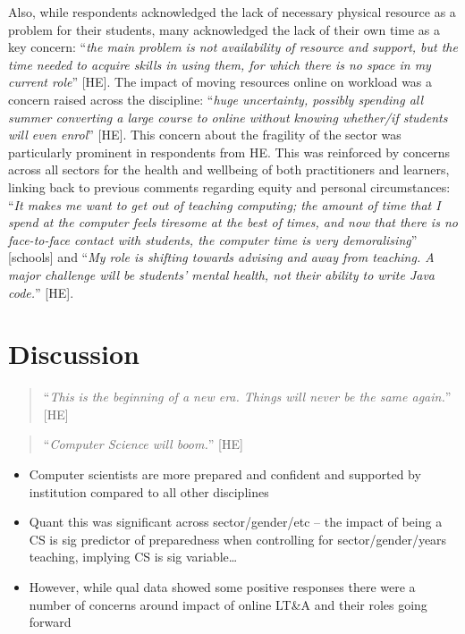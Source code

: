 \documentclass[sigconf]{acmart}
\begin{document}
Also, while respondents acknowledged the lack of necessary physical
resource as a problem for their students, many acknowledged the lack
of their own time as a key concern: ``{\emph{the main problem is not
availability of resource and support, but the time needed to acquire
skills in using them, for which there is no space in my current
role}}'' [HE]. The impact of moving resources online on workload was a
concern raised across the discipline: ``{\emph{huge uncertainty,
possibly spending all summer converting a large course to online
without knowing whether/if students will even enrol}}'' [HE]. This
concern about the fragility of the sector was particularly prominent
in respondents from HE. This was reinforced by concerns across all
sectors for the health and wellbeing of both practitioners and
learners, linking back to previous comments regarding equity and
personal circumstances: ``{\emph{It makes me want to get out of
teaching computing; the amount of time that I spend at the computer
feels tiresome at the best of times, and now that there is no
face-to-face contact with students, the computer time is very
demoralising}}'' [schools] and ``{\emph{My role is shifting towards
advising and away from teaching. A major challenge will be students'
mental health, not their ability to write Java code.}}'' [HE].

\section{Discussion}\label{discussion}

\begin{quotation}
``{\emph{This is the beginning of a new era. Things will never be the
same again.}}'' [HE]
\end{quotation}

\begin{quotation}
``{\emph{Computer Science will boom.}}'' [HE]
\end{quotation}

\begin{itemize}
\item Computer scientists are more prepared and confident and
supported by institution compared to all other disciplines
\item Quant this was significant across sector/gender/etc – the impact
of being a CS is sig predictor of preparedness when controlling for
sector/gender/years teaching, implying CS is sig variable…
\item However, while qual data showed some positive responses there
were a number of concerns around impact of online LT\&A and their roles going
forward
\end{itemize}
\end{document}
